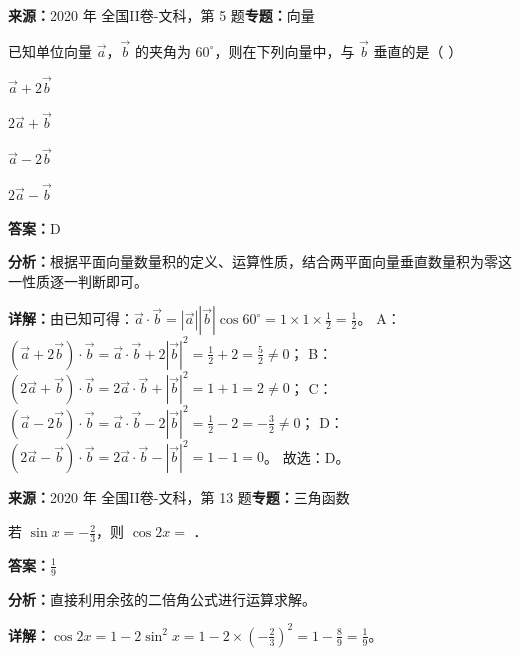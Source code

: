 \begin{question}[points=5]
\textbf{来源：}2020 年 全国II卷-文科，第 5 题\quad \textbf{专题：}向量\par
已知单位向量 $\vec{a}$，$\vec{b}$ 的夹角为 $60^\circ$，则在下列向量中，与 $\vec{b}$ 垂直的是（ ）
\begin{choices}
  \item $\vec{a}+2\vec{b}$
  \item $2\vec{a}+\vec{b}$
  \item $\vec{a}-2\vec{b}$
  \item $2\vec{a}-\vec{b}$
\end{choices}
\begin{solution}
\textbf{答案：}D

\textbf{分析：}根据平面向量数量积的定义、运算性质，结合两平面向量垂直数量积为零这一性质逐一判断即可。

\textbf{详解：}由已知可得：$\vec{a}\cdot\vec{b}=|\vec{a}||\vec{b}|\cos60^\circ=1\times1\times\frac{1}{2}=\frac{1}{2}$。
A：$(\vec{a}+2\vec{b})\cdot\vec{b}=\vec{a}\cdot\vec{b}+2|\vec{b}|^2=\frac{1}{2}+2=\frac{5}{2}\neq0$；
B：$(2\vec{a}+\vec{b})\cdot\vec{b}=2\vec{a}\cdot\vec{b}+|\vec{b}|^2=1+1=2\neq0$；
C：$(\vec{a}-2\vec{b})\cdot\vec{b}=\vec{a}\cdot\vec{b}-2|\vec{b}|^2=\frac{1}{2}-2=-\frac{3}{2}\neq0$；
D：$(2\vec{a}-\vec{b})\cdot\vec{b}=2\vec{a}\cdot\vec{b}-|\vec{b}|^2=1-1=0$。
故选：D。
\end{solution}
\end{question}

\begin{question}[points=5]
\textbf{来源：}2020 年 全国II卷-文科，第 13 题\quad \textbf{专题：}三角函数\par
若 $\sin x = -\frac{2}{3}$，则 $\cos 2x = $ ．
\fillin[{$\frac{1}{9}$}]
\begin{solution}
\textbf{答案：}$\frac{1}{9}$

\textbf{分析：}直接利用余弦的二倍角公式进行运算求解。

\textbf{详解：}$\cos 2x = 1-2\sin^2 x = 1-2\times\left(-\frac{2}{3}\right)^2 = 1-\frac{8}{9} = \frac{1}{9}$。
\end{solution}
\end{question}

